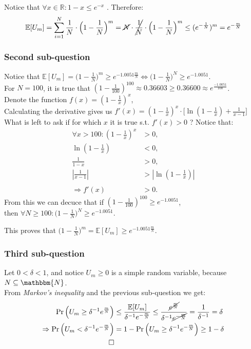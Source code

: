 \documentclass[a4paper]{article}
\newcommand{\E}{\mathbb{E}}
\newcommand{\N}{\mathbbm{N}}
\newcommand{\Sum}{\sum\limits_{i=1}^N}
\newcommand{\qedsquare}{\tag*{$\square$}}
\newcommand{\fn}{\frac{1}{N}}
\newcommand{\mn}{\frac{m}{N}}
\newcommand{\de}{\delta^{-1}e^{-\mn}}
\newcommand{\e}{e^{-1.0051 \mn}}
\begin{document}
Notice that $ \forall x \in \mathbb{R} : 1-x \leq e^{-x} $ . Therefore:
\begin{align*}
    \E[U_m] = \Sum \fn \cdot \Big( 1-\fn \Big)^m = \cancel{N} \cdot \cancel{\fn} \cdot \Big(1-\fn \Big)^m \leq (e^{-\fn})^m = e^{-\mn}
\end{align*}

\subsubsection {Second sub-question}
Notice that $ \E[U_m] = \Big(1-\frac{1}{N}\Big)^m \geq \e \iff
\Big(1-\frac{1}{N}\Big)^N \geq e^{-1.0051} $. \\
For $ N = 100 $, it is true that $ (1-\frac{1}{100})^{100} \approx 0.36603
\geq 0.36600 \approx e^{\frac{-1.0051}{100}} $. \\

Denote the function $ f(x)=(1-\frac{1}{x})^x $, \\
Calculating the derivative gives us $ f'(x) = (1-\frac{1}{x})^x \cdot \Big[ \ln(1-\frac{1}{x}) + \frac{1}{x-1} \Big] $ \\
What is left to ask if for which $x$ it is true s.t. $ f'(x) > 0 $ ? Notice that:
\begin{align*}
    \forall x > 100 :
    (1-\frac{1}{x})^x &> 0, \\
    \ln(1-\frac{1}{x}) &< 0, \\
    \frac{1}{1-x} &> 0, \\
    |\frac{1}{x-1}| &> |\ln(1-\frac{1}{x})| \\
    \\
    \Rightarrow f'(x) &> 0 .
\end{align*}
From this we can decuce that if $ (1-\frac{1}{100})^{100} \geq e^{-1.0051} $, \\
then $ \forall N \geq 100 : \Big( 1-\fn \Big) ^N \geq e^{-1.0051} $.

This proves that $ \Big( 1-\fn \Big)^m = \E[U_m] \geq \e $.

\subsubsection {Third sub-question}

Let $ 0 < \delta < 1 $, and notice $ U_m \geq 0 $ is a simple random variable, because $ N \subseteq \N $. \\
From \textit{Markov's inequality} and the previous sub-question we get:
\begin{align*}
    \Pr \Big( U_m \geq \delta^{-1} e^{\mn} \Big) &\leq \frac{\E[U_m]}{\de}
    \leq \frac{\cancel{e^{\mn}}}{\delta^{-1}{\cancel{e^{-\mn}}}} = \frac{1}{\delta^{-1}} = \delta \\
    \Rightarrow \Pr \Big( U_m < \de \Big) &= 1 - \Pr \Big( U_m \geq \de \Big) \geq 1-\delta \\
    \qedsquare
\end{align*}
\end{document}
